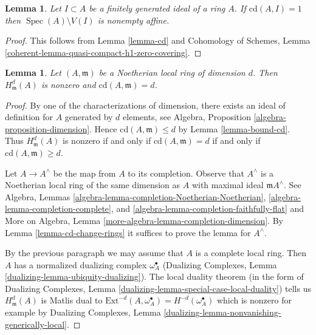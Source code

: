 \documentclass{stacks-project}
\theoremstyle{plain}
\newtheorem{lemma}[subsection]{Lemma}
\theoremstyle{definition}
\theoremstyle{remark}
\numberwithin{equation}{subsection}
\def\Spec{\mathop{\mathrm{Spec}}}
\begin{document}
\begin{lemma}
\label{lemma-cd-is-one}
Let $I \subset A$ be a finitely generated ideal of a ring $A$. If
$\text{cd}(A, I) = 1$ then $\Spec(A) \setminus V(I)$ is nonempty affine.
\end{lemma}

\begin{proof}
This follows from Lemma \ref{lemma-cd} and
Cohomology of Schemes, Lemma
\ref{coherent-lemma-quasi-compact-h1-zero-covering}.
\end{proof}

\begin{lemma}
\label{lemma-cd-maximal}
Let $(A, \mathfrak m)$ be a Noetherian local ring of dimension $d$.
Then $H^d_\mathfrak m(A)$ is nonzero and $\text{cd}(A, \mathfrak m) = d$.
\end{lemma}

\begin{proof}
By one of the characterizations of dimension, there exists
an ideal of definition for $A$ generated by $d$ elements, see
Algebra, Proposition \ref{algebra-proposition-dimension}.
Hence $\text{cd}(A, \mathfrak m) \leq d$ by
Lemma \ref{lemma-bound-cd}. Thus $H^d_\mathfrak m(A)$ is
nonzero if and only if $\text{cd}(A, \mathfrak m) = d$ if and only if
$\text{cd}(A, \mathfrak m) \geq d$.

\medskip\noindent
Let $A \to A^\wedge$ be the map from $A$ to its completion.
Observe that $A^\wedge$ is a Noetherian local ring of the
same dimension as $A$ with maximal ideal $\mathfrak m A^\wedge$.
See Algebra, Lemmas
\ref{algebra-lemma-completion-Noetherian-Noetherian},
\ref{algebra-lemma-completion-complete}, and
\ref{algebra-lemma-completion-faithfully-flat} and
More on Algebra, Lemma \ref{more-algebra-lemma-completion-dimension}.
By Lemma \ref{lemma-cd-change-rings}
it suffices to prove the lemma for $A^\wedge$.

\medskip\noindent
By the previous paragraph we may assume that $A$ is
a complete local ring. Then $A$ has a normalized dualizing complex
$\omega_A^\bullet$ (Dualizing Complexes, Lemma
\ref{dualizing-lemma-ubiquity-dualizing}).
The local duality theorem (in the form of
Dualizing Complexes, Lemma \ref{dualizing-lemma-special-case-local-duality})
tells us $H^d_\mathfrak m(A)$ is Matlis dual to
$\text{Ext}^{-d}(A, \omega_A^\bullet) = H^{-d}(\omega_A^\bullet)$
which is nonzero for example by
Dualizing Complexes, Lemma
\ref{dualizing-lemma-nonvanishing-generically-local}.
\end{proof}
\end{document}
